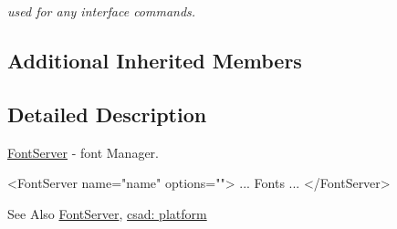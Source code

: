 \begin{DoxyCompactItemize}
\begin{DoxyCompactList}\small\item\em used for any interface commands. \end{DoxyCompactList}\end{DoxyCompactItemize}
\subsection*{Additional Inherited Members}


\subsection{Detailed Description}
\hyperlink{classcsad_1_1_font_server}{Font\-Server} -\/ font Manager. 

\begin{DoxyVerb}  <FontServer name="name" options="">
  ... Fonts ...
  </FontServer>
\end{DoxyVerb}


\begin{DoxySeeAlso}{See Also}
\hyperlink{classcsad_1_1_font_server}{Font\-Server}, \hyperlink{group__platform}{csad\-: platform} 
\end{DoxySeeAlso}
